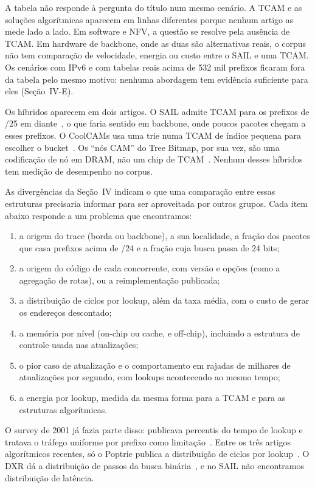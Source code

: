 \documentclass[conference,a4paper]{IEEEtran}
\begin{document}
A tabela não responde à pergunta do título num mesmo cenário. A TCAM e as soluções algorítmicas aparecem em linhas
diferentes porque nenhum artigo as mede lado a lado. Em software e NFV, a questão se resolve pela ausência de TCAM. Em
hardware de backbone, onde as duas são alternativas reais, o corpus não tem comparação de velocidade, energia ou custo
entre o SAIL e uma TCAM. Os cenários com IPv6 e com tabelas reais acima de 532 mil prefixos ficaram fora da tabela pelo
mesmo motivo: nenhuma abordagem tem evidência suficiente para eles (Seção~IV-E).

Os híbridos aparecem em dois artigos. O SAIL admite TCAM para os prefixos de /25 em diante~\cite[\S I-D]{yang18}, o que
faria sentido em backbone, onde poucos pacotes chegam a esses prefixos. O CoolCAMs usa uma trie numa TCAM de índice pequena
para escolher o bucket~\cite[\S IV]{zane03}. Os ``nós CAM'' do Tree Bitmap, por sua vez, são uma codificação de nó em DRAM,
não um chip de TCAM~\cite[\S5.5]{eath04}. Nenhum desses híbridos tem medição de desempenho no corpus.

As divergências da Seção~IV indicam o que uma comparação entre essas estruturas precisaria informar para ser
aproveitada por outros grupos. Cada item abaixo responde a um problema que encontramos:
\begin{enumerate}
\item a origem do trace (borda ou backbone), a sua localidade, a fração dos pacotes que casa prefixos acima de /24 e a fração cuja busca passa de 24 bits;
\item a origem do código de cada concorrente, com versão e opções (como a agregação de rotas), ou a reimplementação
  publicada;
\item a distribuição de ciclos por lookup, além da taxa média, com o custo de gerar os endereços descontado;
\item a memória por nível (on-chip ou cache, e off-chip), incluindo a estrutura de controle usada nas atualizações;
\item o pior caso de atualização e o comportamento em rajadas de milhares de atualizações por segundo, com lookups
  acontecendo ao mesmo tempo;
\item a energia por lookup, medida da mesma forma para a TCAM e para as estruturas algorítmicas.
\end{enumerate}
O survey de 2001 já fazia parte disso: publicava percentis do tempo de lookup e tratava o tráfego uniforme por prefixo
como limitação~\cite[Tab.~3, p.~22]{ruiz01}. Entre os três artigos algorítmicos recentes, só o Poptrie publica a
distribuição de ciclos por lookup~\cite[Tab.~4]{asai15}. O DXR dá a distribuição de passos da busca
binária~\cite[Tab.~3]{zec12}, e no SAIL não encontramos distribuição de latência.
\end{document}
